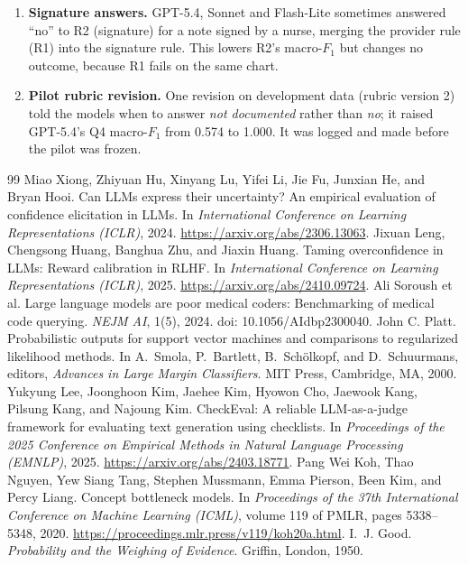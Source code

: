 \documentclass[10pt,letterpaper]{article}
\newcommand{\nd}{\textit{not documented}}
\begin{document}
\begin{enumerate}[label=\arabic*.,ref=\arabic*]
\item\label{note:r2} \textbf{Signature answers.} GPT-5.4, Sonnet and Flash-Lite sometimes answered ``no'' to R2 (signature) for a note signed by a nurse, merging the provider rule (R1) into the signature rule. This lowers R2's macro-$F_1$ but changes no outcome, because R1 fails on the same chart.
\item\label{note:pilot} \textbf{Pilot rubric revision.} One revision on development data (rubric version 2) told the models when to answer \nd{} rather than \textit{no}; it raised GPT-5.4's Q4 macro-$F_1$ from 0.574 to 1.000. It was logged and made before the pilot was frozen.
\end{enumerate}

\clearpage
\begin{thebibliography}{99}\small
{} Miao Xiong, Zhiyuan Hu, Xinyang Lu, Yifei Li, Jie Fu, Junxian He, and Bryan Hooi. Can LLMs express their uncertainty? An empirical evaluation of confidence elicitation in LLMs. In \emph{International Conference on Learning Representations (ICLR)}, 2024. \url{https://arxiv.org/abs/2306.13063}.
 Jixuan Leng, Chengsong Huang, Banghua Zhu, and Jiaxin Huang. Taming overconfidence in LLMs: Reward calibration in RLHF. In \emph{International Conference on Learning Representations (ICLR)}, 2025. \url{https://arxiv.org/abs/2410.09724}.
 Ali Soroush et al. Large language models are poor medical coders: Benchmarking of medical code querying. \emph{NEJM AI}, 1(5), 2024. doi: 10.1056/AIdbp2300040.
 John C. Platt. Probabilistic outputs for support vector machines and comparisons to regularized likelihood methods. In A.~Smola, P.~Bartlett, B.~Sch\"olkopf, and D.~Schuurmans, editors, \emph{Advances in Large Margin Classifiers}. MIT Press, Cambridge, MA, 2000.
 Yukyung Lee, Joonghoon Kim, Jaehee Kim, Hyowon Cho, Jaewook Kang, Pilsung Kang, and Najoung Kim. CheckEval: A reliable LLM-as-a-judge framework for evaluating text generation using checklists. In \emph{Proceedings of the 2025 Conference on Empirical Methods in Natural Language Processing (EMNLP)}, 2025. \url{https://arxiv.org/abs/2403.18771}.
 Pang Wei Koh, Thao Nguyen, Yew Siang Tang, Stephen Mussmann, Emma Pierson, Been Kim, and Percy Liang. Concept bottleneck models. In \emph{Proceedings of the 37th International Conference on Machine Learning (ICML)}, volume 119 of PMLR, pages 5338--5348, 2020. \url{https://proceedings.mlr.press/v119/koh20a.html}.
 I.~J. Good. \emph{Probability and the Weighing of Evidence}. Griffin, London, 1950.

\end{thebibliography}
\end{document}
